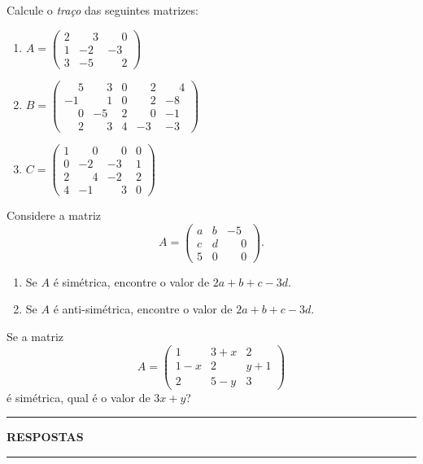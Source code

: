 \documentclass[12pt]{exam}
\begin{document}
\begin{exercicio}
    Calcule o \textit{traço} das seguintes matrizes:
    \begin{enumerate}[label={\alph*})]
        \item $A = \begin{pmatrix}2 & \phantom{-} 3 & \phantom{-} 0\\1 & -2 & -3\\3 & -5 & \phantom{-} 2\end{pmatrix}$
        \item $B = \begin{pmatrix}\phantom{-} 5 & \phantom{-} 3 & 0 & \phantom{-} 2 & \phantom{-} 4\\-1 & \phantom{-} 1 & 0 & \phantom{-} 2 & -8\\\phantom{-} 0 & -5 & 2 & \phantom{-} 0 & -1\\\phantom{-} 2 & \phantom{-} 3 & 4 & -3 & -3\end{pmatrix}$
        \item $C = \begin{pmatrix}1 & \phantom{-} 0 & \phantom{-} 0 & 0\\0 & -2 & -3 & 1\\2 & \phantom{-} 4 & -2 & 2\\4 & -1 & \phantom{-} 3 & 0\end{pmatrix}$
    \end{enumerate}
\end{exercicio}

\begin{exercicio}
    Considere a matriz
        \[
            A = \begin{pmatrix}a & b & -5\\c & d & \phantom{-} 0\\5 & 0 & \phantom{-} 0\end{pmatrix}.
        \]
        \begin{enumerate}[label={\alph*})]
            \item Se $A$ é simétrica, encontre o valor de $2a + b + c - 3d$.
            \item Se $A$ é anti-simétrica, encontre o valor de $2a + b + c - 3d$.
        \end{enumerate}
\end{exercicio}

\begin{exercicio}
    Se a matriz
        \[
            A = \begin{pmatrix}1 & 3 + x & 2\\1 - x & 2 & y + 1\\2 & 5 - y & 3\end{pmatrix}
        \]
        é simétrica, qual é o valor de $3x + y$?
\end{exercicio}

\newpage
{}
\hrule
\begin{center}
{\large\bf RESPOSTAS}
\end{center}
\hrule

\end{document}
